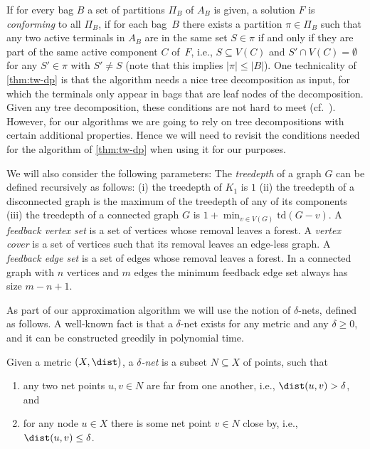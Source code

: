 If for every bag $B$ a set of partitions $\Pi_B$ of $A_B$ is given, a
\SF solution $F$ is \emph{conforming} to all $\Pi_B$, if for each bag~$B$ there exists a partition
$\pi\in\Pi_B$ such that any two active terminals in $A_B$ are in the same set
$S\in\pi$ if and only if they are part of the same active component $C$ of~$F$,
i.e., $S\subseteq V(C)$ and $S'\cap V(C)=\emptyset$ for any $S'\in\pi$ with
$S'\neq S$ (note that this implies $|\pi|\leq |B|$). One technicality of \cref{thm:tw-dp} is that
the algorithm needs a nice tree decomposition as input, for which the terminals
only appear in bags that are leaf nodes of the decomposition. Given any tree
decomposition, these conditions are not hard to meet
(cf.~\cite[Lemma~6]{bateni2011approximation}).  However, for our algorithms we
are going to rely on tree decompositions with certain additional properties.
Hence we will need to revisit the conditions needed for the algorithm of
\autoref{thm:tw-dp} when using it for our purposes.

We will also consider the following parameters: 
The \emph{treedepth} of a graph $G$ can be defined recursively as follows: (i) the treedepth of $K_1$ is $1$ (ii) the treedepth of a disconnected graph is the maximum of the treedepth of any of its components (iii) the treedepth of a connected graph $G$ is $1+\min_{v\in V(G)} \textrm{td}(G-v)$. 
A \emph{feedback vertex set} is a set of vertices whose removal leaves a forest. A \emph{vertex cover} is a set of vertices such that its removal leaves an edge-less graph. A \emph{feedback edge set} is a set of edges whose removal leaves a forest. In a connected graph with $n$ vertices and $m$ edges the minimum feedback edge set always has size $m-n+1$.

As part of our approximation algorithm we will use the notion of $\delta$-nets, defined as follows. 
A well-known fact is that a $\delta$-net exists for any metric and any $\delta\geq 0$, 
and it can be constructed greedily in polynomial time. 

\begin{definition}\label{dfn:net}
Given a metric $(X,\dist)$, a \emph{$\delta$-net} is a subset $N\subseteq X$ of points, such that
\begin{enumerate}
    \item any two net points $u,v\in N$ are far from one another, i.e., $\dist(u,v)>\delta$, and
    \item for any node $u\in X$ there is some net point $v\in N$ close by, i.e., $\dist(u,v)\leq\delta$.
\end{enumerate}
\end{definition}

